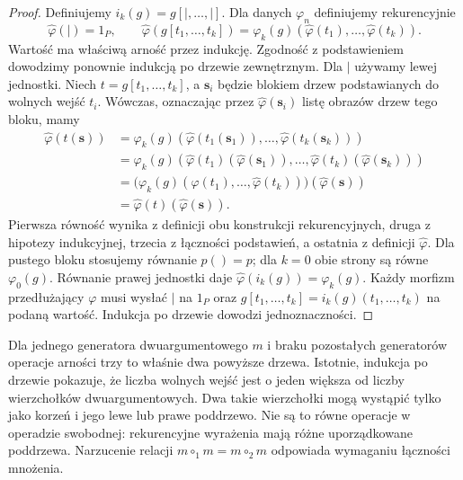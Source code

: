 \begin{proof}
Definiujemy $i_k(g)=g[\vert,\ldots,\vert]$. Dla danych $\varphi_n$ definiujemy rekurencyjnie
\[
 \widehat\varphi(\vert)=1_P,\qquad
 \widehat\varphi(g[t_1,\ldots,t_k])
 =\varphi_k(g)(\widehat\varphi(t_1),\ldots,\widehat\varphi(t_k)).
\]
Wartość ma właściwą arność przez indukcję. Zgodność z podstawieniem dowodzimy ponownie indukcją po drzewie zewnętrznym. Dla $\vert$ używamy lewej jednostki. Niech $t=g[t_1,\ldots,t_k]$, a $\mathbf s_i$ będzie blokiem drzew podstawianych do wolnych wejść $t_i$. Wówczas, oznaczając przez $\widehat\varphi(\mathbf s_i)$ listę obrazów drzew tego bloku, mamy
\[
\begin{aligned}
 \widehat\varphi(t(\mathbf s))
 &=\varphi_k(g)(\widehat\varphi(t_1(\mathbf s_1)),\ldots,
                  \widehat\varphi(t_k(\mathbf s_k)))\\
 &=\varphi_k(g)(\widehat\varphi(t_1)(\widehat\varphi(\mathbf s_1)),
                 \ldots,\widehat\varphi(t_k)(\widehat\varphi(\mathbf s_k)))\\
 &=\bigl(\varphi_k(g)(\widehat\varphi(t_1),\ldots,
                  \widehat\varphi(t_k))\bigr)(\widehat\varphi(\mathbf s))\\
 &=\widehat\varphi(t)(\widehat\varphi(\mathbf s)).
\end{aligned}
\]
Pierwsza równość wynika z definicji obu konstrukcji rekurencyjnych, druga z hipotezy indukcyjnej, trzecia z łączności podstawień, a ostatnia z definicji $\widehat\varphi$. Dla pustego bloku stosujemy równanie $p()=p$; dla $k=0$ obie strony są równe $\varphi_0(g)$. Równanie prawej jednostki daje $\widehat\varphi(i_k(g))=\varphi_k(g)$. Każdy morfizm przedłużający $\varphi$ musi wysłać $\vert$ na $1_P$ oraz $g[t_1,\ldots,t_k]=i_k(g)(t_1,\ldots,t_k)$ na podaną wartość. Indukcja po drzewie dowodzi jednoznaczności.
\end{proof}

\begin{center}
\end{center}
Dla jednego generatora dwuargumentowego $m$ i braku pozostałych generatorów operacje arności trzy to właśnie dwa powyższe drzewa. Istotnie, indukcja po drzewie pokazuje, że liczba wolnych wejść jest o jeden większa od liczby wierzchołków dwuargumentowych. Dwa takie wierzchołki mogą wystąpić tylko jako korzeń i jego lewe lub prawe poddrzewo. Nie są to równe operacje w operadzie swobodnej: rekurencyjne wyrażenia mają różne uporządkowane poddrzewa. Narzucenie relacji $m\circ_1m=m\circ_2m$ odpowiada wymaganiu łączności mnożenia.

